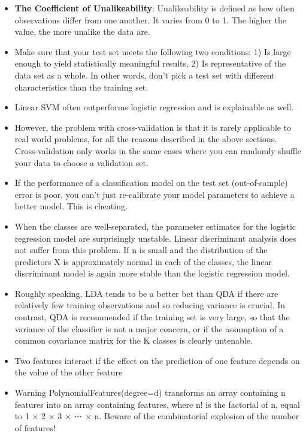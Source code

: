 \documentclass[]{book}
\begin{document}
\begin{itemize}
\item
  \textbf{The Coefficient of Unalikeability}: Unalikeability is defined
  as how often observations differ from one another. It varies from 0 to
  1. The higher the value, the more unalike the data are.
\item
  Make sure that your test set meets the following two conditions: 1) Is
  large enough to yield statistically meaningful results, 2) Is
  representative of the data set as a whole. In other words, don't pick
  a test set with different characteristics than the training set.
\item
  Linear SVM often outperforms logistic regression and is explainable as
  well.
\item
  However, the problem with cross-validation is that it is rarely
  applicable to real world problems, for all the reasons described in
  the above sections. Cross-validation only works in the same cases
  where you can randomly shuffle your data to choose a validation set.
\item
  If the performance of a classification model on the test set
  (out-of-sample) error is poor, you can't just re-calibrate your model
  parameters to achieve a better model. This is cheating.
\item
  When the classes are well-separated, the parameter estimates for the
  logistic regression model are surprisingly unstable. Linear
  discriminant analysis does not suffer from this problem. If n is small
  and the distribution of the predictors X is approximately normal in
  each of the classes, the linear discriminant model is again more
  stable than the logistic regression model.
\item
  Roughly speaking, LDA tends to be a better bet than QDA if there are
  relatively few training observations and so reducing variance is
  crucial. In contrast, QDA is recommended if the training set is very
  large, so that the variance of the classifier is not a major concern,
  or if the assumption of a common covariance matrix for the K classes
  is clearly untenable.
\item
  Two features interact if the effect on the prediction of one feature
  depends on the value of the other feature
\item
  Warning PolynomialFeatures(degree=d) transforms an array containing n
  features into an array containing features, where n! is the factorial
  of n, equal to 1 × 2 × 3 × ⋯ × n. Beware of the combinatorial
  explosion of the number of features!

\end{itemize}
\end{document}
